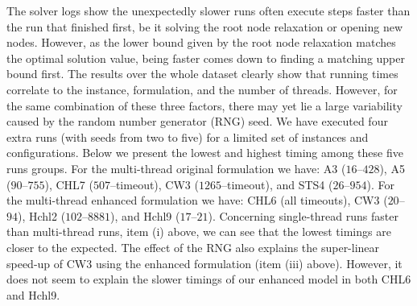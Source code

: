 \documentclass[9pt]{entcs}
\begin{document}
The solver logs show the unexpectedly slower runs often execute steps faster than the run that finished first, be it solving the root node relaxation or opening new nodes.
However, as the lower bound given by the root node relaxation matches the optimal solution value, being faster comes down to finding a matching upper bound first.
The results over the whole dataset clearly show that running times correlate to the instance, formulation, and the number of threads.
However, for the same combination of these three factors, there may yet lie a large variability caused by the random number generator (RNG) seed.
We have executed four extra runs (with seeds from two to five) for a limited set of instances and configurations.
Below we present the lowest and highest timing among these five runs groups.
For the multi-thread original formulation we have: A3 (\(16\)--\(428\)), A5 (\(90\)--\(755\)), CHL7 (\(507\)--timeout), CW3 (\(1265\)--timeout), and STS4 (\(26\)--\(954\)).
For the multi-thread enhanced formulation we have: CHL6 (all timeouts), CW3 (\(20\)--\(94\)), Hchl2 (\(102\)--\(8881\)), and Hchl9 (\(17\)--\(21\)).
Concerning single-thread runs faster than multi-thread runs, item (i) above, we can see that the lowest timings are closer to the expected.
The effect of the RNG also explains the super-linear speed-up of CW3 using the enhanced formulation (item (iii) above).
However, it does not seem to explain the slower timings of our enhanced model in both CHL6 and Hchl9.


\end{document}
